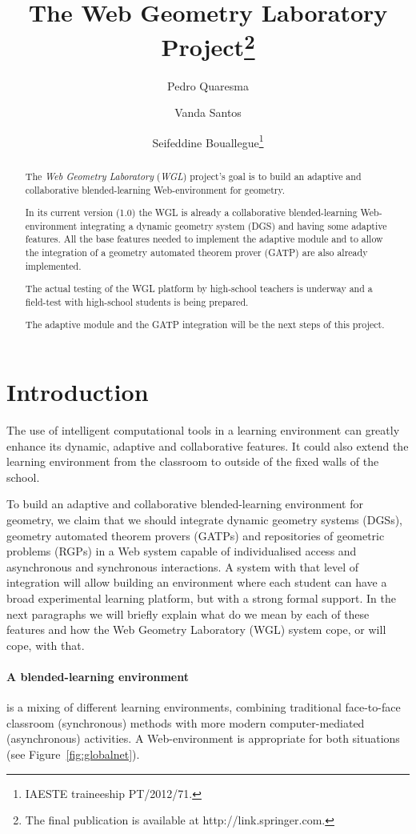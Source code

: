 \documentclass{llncs}
\title{The Web Geometry Laboratory Project\thanks{The final
    publication is available at http://link.springer.com.}}
\author{Pedro Quaresma\inst{1} 
  \and Vanda Santos\inst{2} 
  \and Seifeddine Bouallegue\inst{3}\thanks{IAESTE traineeship PT/2012/71.}
}
\institute{
  CISUC/Department of Mathematics, University of Coimbra \\
  3001-454 Coimbra, Portugal, \email{pedro@mat.uc.pt} \\
  \and
  CISUC, 3001-454 Coimbra, Portugal, \email{vsantos7@gmail.com} \\
  \and Innov'Com / University of Carthage, Tunisia,
  \email{saief.bouallegue@gmail.com} } \date{}
\newcommand{\WGL}{{\em WGL}}
\begin{document}
\maketitle

\begin{abstract}
  The \emph{Web Geometry Laboratory} (\WGL) project's goal is to build
  an adaptive and collaborative blended-learning Web-environment for
  geometry.

  In its current version (1.0) the WGL is already a collaborative
  blended-learning Web-environment integrating a dynamic geometry
  system (DGS) and having some adaptive features. All the base
  features needed to implement the adaptive module and to allow the
  integration of a geometry automated theorem prover (GATP) are also
  already implemented.

  The actual testing of the WGL platform by high-school teachers is
  underway and a field-test with high-school students is being
  prepared.

  The adaptive module and the GATP integration will be the next steps
  of this project.

\end{abstract}


\section{Introduction}
\label{sec:introduction}

The use of intelligent computational tools in a learning environment
can greatly enhance its dynamic, adaptive and collaborative
features. It could also extend the learning environment from the
classroom to outside of the fixed walls of the school.

To build an adaptive and collaborative blended-learning environment
for geometry, we claim that we should integrate dynamic geometry
systems (DGSs), geometry automated theorem provers (GATPs) and
repositories of geometric problems (RGPs) in a Web system capable of
individualised access and asynchronous and synchronous interactions. A
system with that level of integration will allow building an
environment where each student can have a broad experimental learning
platform, but with a strong formal support. In the next paragraphs we
will briefly explain what do we mean by each of these features and how
the Web Geometry Laboratory (WGL) system cope, or will cope, with
that.

\paragraph{A blended-learning environment} is a mixing of different
learning environments, combining traditional face-to-face classroom
(synchronous) methods with more modern computer-mediated
(asynchronous) activities. A Web-environment is appropriate for both
situations (see Figure~\ref{fig:globalnet}).
\end{document}
